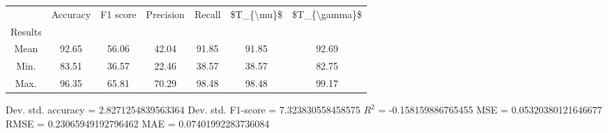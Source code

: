 \begin{tabular}{|c|c|c|c|c|c|c|}
\toprule
{} &  Accuracy &  F1 score &  Precision &  Recall &  \$T\_\{\textbackslash mu\}\$ &  \$T\_\{\textbackslash gamma\}\$ \\
Results &           &           &            &         &            &               \\
\hline
Mean    &     92.65 &     56.06 &      42.04 &   91.85 &      91.85 &         92.69 \\
Min.    &     83.51 &     36.57 &      22.46 &   38.57 &      38.57 &         82.75 \\
Max.    &     96.35 &     65.81 &      70.29 &   98.48 &      98.48 &         99.17 \\
\bottomrule
\end{tabular}

 Dev. std. accuracy = 2.8271254839563364
 Dev. std. F1-score = 7.323830558458575
 $R^2$ = -0.158159886765455
 MSE = 0.05320380121646677
 RMSE = 0.23065949192796462
 MAE = 0.07401992283736084